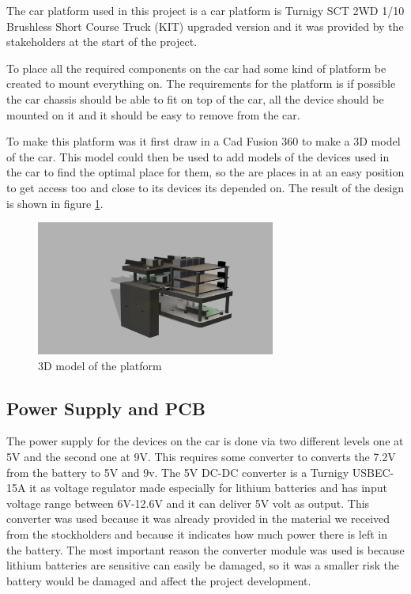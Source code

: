 \documentclass[11pt, titlepage]{article} %
\begin{document}
The car platform used in this project is a car platform is Turnigy SCT 2WD 1/10 Brushless Short Course Truck (KIT) upgraded version and it was provided by the stakeholders at the start of the project. 

To place all the required components on the car had some kind of platform be created to mount everything on. The requirements for the platform is if possible the car chassis should be able to fit on top of the car, all the device should be mounted on it and it should be easy to remove from the car. 

To make this platform was it first draw in a Cad Fusion 360 to make a 3D model of the car. This model could then be used to add models of the devices used in the car to find the optimal place for them, so the are places in at an easy position to get access too and close to its devices its depended on. The result of the design is shown in figure \ref{fig:3d_platform}. 

\begin{figure}
    \centering
	\includegraphics[width=0.7\textwidth]{platform.png}
	\caption{3D model of the platform}
	\label{fig:3d_platform}
\end{figure}

\subsection{Power Supply and PCB}

The power supply for the devices on the car is done via two different levels one at 5V and the second one at 9V. This requires some converter to converts the 7.2V from the battery to 5V and 9v. The 5V DC-DC converter is a Turnigy USBEC-15A it as voltage regulator made especially for lithium batteries and has input voltage range between 6V-12.6V and it can deliver 5V volt as output. This converter was used because it was already provided in the material we received from the stockholders and because it indicates how much power there is left in the battery. The most important reason the converter module was used is because lithium batteries are sensitive can easily be damaged, so it was a smaller risk the battery would be damaged and affect the project development. 
\end{document}
